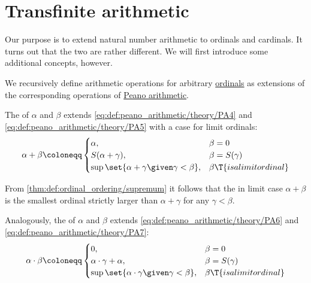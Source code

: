 \section{Transfinite arithmetic}\label{sec:transfinite_arithmetic}

Our purpose is to extend natural number arithmetic to ordinals and cardinals. It turns out that the two are rather different. We will first introduce some additional concepts, however.

\begin{definition}\label{def:ordinal_arithmetic}
  We recursively define arithmetic operations for arbitrary \hyperref[def:ordinal]{ordinals} as extensions of the corresponding operations of \hyperref[def:peano_arithmetic]{Peano arithmetic}.

  \begin{thmenum}
     The  of \( \alpha \) and \( \beta \) extends \eqref{eq:def:peano_arithmetic/theory/PA4} and \eqref{eq:def:peano_arithmetic/theory/PA5} with a case for limit ordinals:
    \begin{equation}\label{eq:def:ordinal_arithmetic/addition}
      \alpha + \beta \coloneqq \begin{cases}
        \alpha,                                            &\beta = 0 \\
        S(\alpha + \gamma),                          &\beta = S(\gamma) \\
        \sup\set{ \alpha + \gamma \given \gamma < \beta }, &\beta \T{is a limit ordinal} \\
      \end{cases}
    \end{equation}


    From \cref{thm:def:ordinal_ordering/supremum} it follows that the in limit case \( \alpha + \beta \) is the smallest ordinal strictly larger than \( \alpha + \gamma \) for any \( \gamma < \beta \).

     Analogously, the  of \( \alpha \) and \( \beta \) extends \eqref{eq:def:peano_arithmetic/theory/PA6} and \eqref{eq:def:peano_arithmetic/theory/PA7}:
    \begin{equation}\label{eq:def:ordinal_arithmetic/multiplication}
      \alpha \cdot \beta \coloneqq \begin{cases}
        0,                                                     &\beta = 0 \\
        \alpha \cdot \gamma + \alpha,                          &\beta = S(\gamma) \\
        \sup\set{ \alpha \cdot \gamma \given \gamma < \beta }, &\beta \T{is a limit ordinal} \\
      \end{cases}
    \end{equation}


\end{thmenum}
\end{definition}
